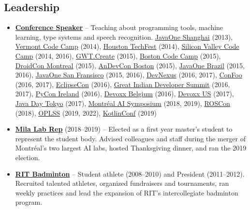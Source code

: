 \documentclass[letterpaper,11pt]{article}
\newcommand{\resumeItem}[2]{
  \item\small{\textbf{#1}{ #2 }}
}
\newcommand{\resumeSubItem}[2]{\resumeItem{#1}{#2}}
\newcommand{\resumeSubHeadingListStart}{\begin{itemize}[leftmargin=*]}
\newcommand{\resumeSubHeadingListEnd}{\end{itemize}}
\begin{document}
\begin{justify}
\section{Leadership}
\resumeSubHeadingListStart
\resumeSubItem{\href{https://speakerdeck.com/breandan}{Conference Speaker}} {-- Teaching about programming tools, machine learning, type systems and speech recognition.
\href{https://oracle.com/javaone}{JavaOne Shanghai} (2013),
\href{https://www.vtcodecamp.org/}{Vermont Code Camp} (2014),
\href{http://houstontechfest.com/}{Houston TechFest} (2014),
\href{https://svcc.mobi/}{Silicon Valley Code Camp} (2014, 2016),
\href{http://gwtcreate.com/}{GWT.Create} (2015),
\href{https://www.bostoncodecamp.com/}{Boston Code Camp} (2015),
\href{https://www.droidcon.com/}{DroidCon Montreal} (2015),
\href{http://www.andevcon.com/}{AnDevCon Boston} (2015),
\href{https://oracle.com/javaone}{JavaOne Brazil} (2015, 2016),
\href{https://oracle.com/javaone}{JavaOne San Fransisco} (2015, 2016),
\href{https://devnexus.com/}{DevNexus} (2016, 2017),
\href{https://confoo.ca}{ConFoo} (2016, 2017),
\href{https://www.eclipsecon.org/na2016}{EclipseCon} (2016),
\href{https://www.developersummit.com/}{Great Indian Developer Summit} (2016, 2017),
\href{https://python.ie}{PyCon Ireland} (2016),
\href{https://devoxx.com/}{Devoxx Belgium} (2016),
\href{https://devoxx.com/}{Devoxx US} (2017),
\href{https://www.oracle.co.jp/events/javaday/2017/}{Java Day Tokyo} (2017),
\href{http://montrealaisymposium.com/}{Montr\'eal AI Symposium} (2018, 2019),
\href{https://roscon.ros.org}{ROSCon} (2018),
\href{https://www.cs.uoregon.edu/research/summerschool/summer19/topics.php}{OPLSS} (2019, 2022),
\href{https://kotlinconf.com/}{KotlinConf} (2019)
}
\resumeSubItem{\href{https://mila.quebec/}{Mila Lab Rep}} {(2018--2019) -- Elected as a first year master's student to represent the student body. Advised colleagues and staff during the merger of Montr\'eal's two largest AI labs, hosted Thanksgiving dinner, and ran the 2019 election.}
\resumeSubItem{\href{https://www.rit.edu/sg/badminton/}{RIT Badminton}} {-- Student athlete (2008--2010) and President (2011--2012). Recruited talented athletes, organized fundraisers and tournaments, ran weekly practices and lead the expansion of RIT's intercollegiate badminton program.}
\resumeSubHeadingListEnd


\end{justify}
\end{document}
